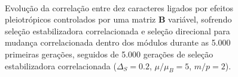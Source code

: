 \begin{figure}[htbp]
    \vspace{-18pt}
    \vspace{11pt}
    \\
    \caption{Evolução da correlação entre dez caracteres ligados por efeitos
        pleiotrópicos controlados por uma matriz $\mathbf{B}$ variável, sofrendo seleção estabilizadora correlacionada e seleção
        direcional para mudança correlacionada dentro dos módulos
        durante as 5.000 primeiras gerações, seguidos de 5.000 gerações de
    seleção estabilizadora correlacionada ($\Delta_S = 0.2$, $\mu/\mu_B=5$, $m/p=2$).}
    \label{posselecao}
\end{figure}



